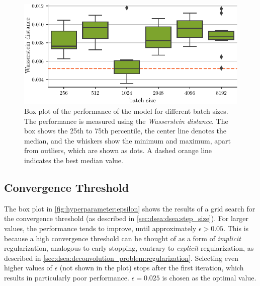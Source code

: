 \begin{figure}
  \centering
  \includegraphics[scale=1]{content/plots/hyperparam/batch_size_vs_wd_boxplot_lessheight.pdf}
  \caption{Box plot of the performance of the model for different batch sizes.
    The performance is measured using the \emph{Wasserstein distance}.
    The box shows the 25th to 75th percentile,
    the center line denotes the median,
    and the whiskers show the minimum and maximum,
      apart from outliers,
        which are shown as dots.
    A dashed orange line indicates the best median value.
  }
  \label{fig:hyperparameter:batch_size}
\end{figure}


\subsection{Convergence Threshold}
The box plot in \autoref{fig:hyperparameter:epsilon} shows the results of a grid search for the convergence threshold
  (as described in \autoref{sec:dsea:dsea:step_size}).
%
For larger values,
  the performance tends to improve,
  until approximately $\epsilon > \num{0.05}$.
This is because a high convergence threshold can be thought of as
  a form of \emph{implicit} regularization, %
    analogous to early stopping,
  contrary to \emph{explicit} regularization,
    as described in \autoref{sec:dsea:deconvolution_problem:regularization}.
Selecting even higher values of $\epsilon$
  (not shown in the plot)
stops \dsea{} after the first iteration,
  which results in particularly poor performance.
$\epsilon = \num{0.025}$ is chosen as the optimal value.


